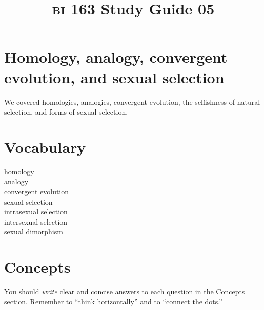 \documentclass[letterpaper]{tufte-handout}
\title{{\scshape bi} 163 Study Guide 05}
\date{} %
\begin{document}
\maketitle	%

\section*{Homology, analogy, convergent evolution, and sexual selection}

We covered homologies, analogies, convergent evolution, the selfishness of natural selection, and forms of sexual selection.

\section*{Vocabulary}

\vspace{-1\baselineskip}
\begin{multicols}{2}
homology \\
analogy\\
convergent evolution \\
sexual selection\\
intrasexual selection\\
intersexual selection\\
sexual dimorphism

\end{multicols}

\section*{Concepts}

You should \emph{write} clear and concise answers to each question in the Concepts section.  Remember to ``think horizontally'' and to ``connect the dots.'' 
\end{document}
